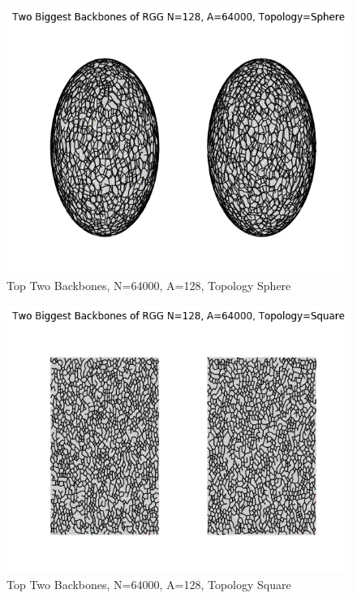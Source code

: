 \documentclass{article}
\begin{document}
    \begin{figure}
      \centering
      \label{backbone_128_64000_Sphere}
      \includegraphics[width=1 \textwidth]{backbone/backbone_128_64000_Sphere.png}
      \caption{Top Two Backbones, N=64000, A=128, Topology Sphere}
    \end{figure}

    \begin{figure}
      \centering
      \label{backbone_128_64000_Square}
      \includegraphics[width=1 \textwidth]{backbone/backbone_128_64000_Square.png}
      \caption{Top Two Backbones, N=64000, A=128, Topology Square}
    \end{figure}
\end{document}
